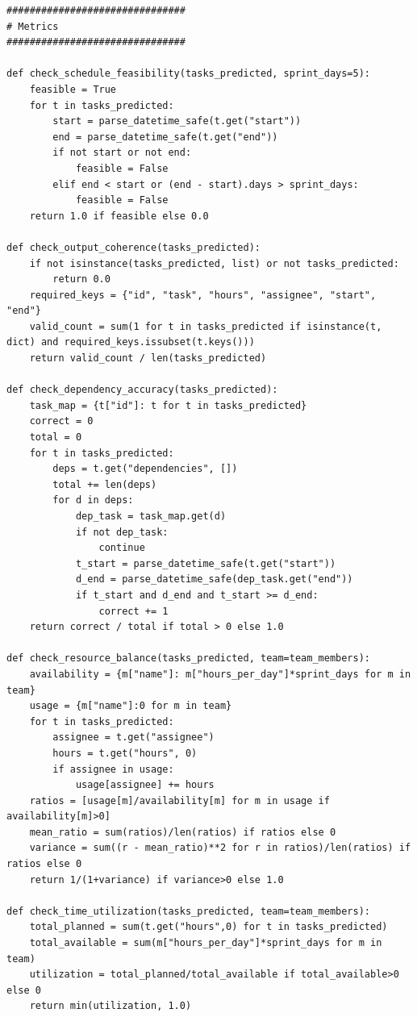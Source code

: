 \documentclass{report}
\begin{document}
\begin{lstlisting}[style=pythonstyle]
###############################
# Metrics
###############################

def check_schedule_feasibility(tasks_predicted, sprint_days=5):
    feasible = True
    for t in tasks_predicted:
        start = parse_datetime_safe(t.get("start"))
        end = parse_datetime_safe(t.get("end"))
        if not start or not end:
            feasible = False
        elif end < start or (end - start).days > sprint_days:
            feasible = False
    return 1.0 if feasible else 0.0

def check_output_coherence(tasks_predicted):
    if not isinstance(tasks_predicted, list) or not tasks_predicted:
        return 0.0
    required_keys = {"id", "task", "hours", "assignee", "start", "end"}
    valid_count = sum(1 for t in tasks_predicted if isinstance(t, dict) and required_keys.issubset(t.keys()))
    return valid_count / len(tasks_predicted)

def check_dependency_accuracy(tasks_predicted):
    task_map = {t["id"]: t for t in tasks_predicted}
    correct = 0
    total = 0
    for t in tasks_predicted:
        deps = t.get("dependencies", [])
        total += len(deps)
        for d in deps:
            dep_task = task_map.get(d)
            if not dep_task:
                continue
            t_start = parse_datetime_safe(t.get("start"))
            d_end = parse_datetime_safe(dep_task.get("end"))
            if t_start and d_end and t_start >= d_end:
                correct += 1
    return correct / total if total > 0 else 1.0

def check_resource_balance(tasks_predicted, team=team_members):
    availability = {m["name"]: m["hours_per_day"]*sprint_days for m in team}
    usage = {m["name"]:0 for m in team}
    for t in tasks_predicted:
        assignee = t.get("assignee")
        hours = t.get("hours", 0)
        if assignee in usage:
            usage[assignee] += hours
    ratios = [usage[m]/availability[m] for m in usage if availability[m]>0]
    mean_ratio = sum(ratios)/len(ratios) if ratios else 0
    variance = sum((r - mean_ratio)**2 for r in ratios)/len(ratios) if ratios else 0
    return 1/(1+variance) if variance>0 else 1.0

def check_time_utilization(tasks_predicted, team=team_members):
    total_planned = sum(t.get("hours",0) for t in tasks_predicted)
    total_available = sum(m["hours_per_day"]*sprint_days for m in team)
    utilization = total_planned/total_available if total_available>0 else 0
    return min(utilization, 1.0)


\end{lstlisting}
\end{document}
